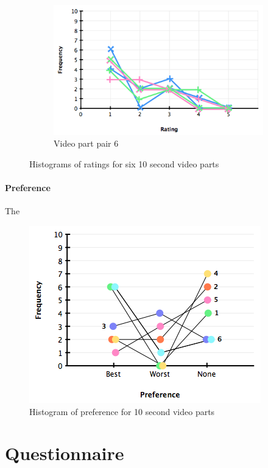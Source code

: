 \begin{figure}
\begin{subfigure}[b]{.32\textwidth}
      \includegraphics[width=\textwidth]{img/evaluation/hist_video6}
    \caption{Video part pair 6}
    \label{fig:evalVideo6}
  \end{subfigure}

  \caption{Histograms of ratings for six 10 second video parts}
  \label{fig:evalVideos}
\end{figure}

\paragraph{Preference}

The 

\begin{figure}[htbp]
  \centering
    \includegraphics[width=.6\textwidth]{img/evaluation/pref_videos_all}
  \caption{Histogram of preference for 10 second video parts}
  \label{fig:evalVideosPref}
\end{figure}
 


\section{Questionnaire} %
\label{sec:questionnaire}

